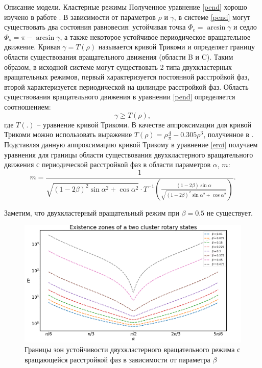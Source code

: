 \begin{chapter}{Описание модели. Кластерные режимы}
	Полученное уравнение \eqref{pend} хорошо изучено в работе \cite{Andronov:Vitt}.
	В зависимости от параметров $\rho$ и $\gamma$, в системе \eqref{pend}
	могут существовать два состояния равновесия:
	устойчивая точка $\Phi_e = \arcsin{\gamma}$ и седло
	$\Phi_s = \pi - \arcsin{\gamma}$, а также
	некоторое устойчивое периодическое вращательное движение.
	Кривая $\gamma=T(\rho)$ называется кривой Трикоми и определяет границу области существования вращательного движения (области B и C).
	Таким образом, в исходной системе могут существовать 2 типа
	двухкластерных вращательных режимов, первый характеризуется
	постоянной расстройкой фаз, второй характеризуется
    периодической на цилиндре расстройкой фаз.
	Область существования вращательного движения в уравнении \eqref{pend}
	определяется соотношением:
	\begin{equation}
		\gamma \ge T(\rho),
		\label{eroi}
	\end{equation}
	где $T(.)$ -- уравнение кривой Трикоми. В качестве аппроксимации для кривой Трикоми можно использовать выражение
	$T(\rho) = \rho\frac{4}{\pi} - 0.305\rho^3$, полученное в \cite{Belykh:Brister}.
	Подставляя данную аппроксимацию кривой Трикому в уравнение \eqref{eroi} получаем уравнения для границы области существования двухкластерного вращательного движения с
	периодической расстройкой фаз в области параметров $\alpha$, $m$:
	\begin{equation} \label{borders}
		m = \frac{1}{\sqrt{(1 - 2\beta)^2\sin{\alpha}^2 + \cos{\alpha}^2} \cdot T^{-1}(\frac{(1 - 2\beta)\sin{\alpha}}{\sqrt{(1 - 2\beta)^2\sin{\alpha}^2 + \cos{\alpha}^2}})}.
	\end{equation}

	Заметим, что двухкластерный вращательный режим при $\beta = 0.5$ не существует.

	\begin{figure}[h!]
		\begin{center}
			\includegraphics[width=1\columnwidth]{pictures/ex.png}
		\end{center}
		\caption{Границы зон устойчивости двухкластерного вращательного режима с вращающейся расстройкой фаз в зависимости от параметра $\beta$}
		\label{ex-zones}
	\end{figure}


\end{chapter}
